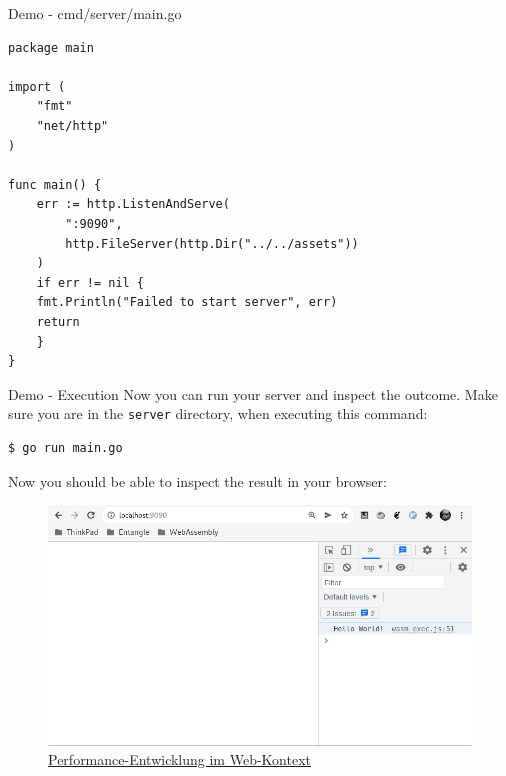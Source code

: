 \documentclass{beamer}
\begin{document}
\begin{frame}[fragile]{Demo - cmd/server/main.go}
    \begin{lstlisting}[language=html,basicstyle=\scriptsize]
package main

import (
	"fmt"
	"net/http"
)

func main() {
    err := http.ListenAndServe(
        ":9090", 
        http.FileServer(http.Dir("../../assets"))
    )
    if err != nil {
	fmt.Println("Failed to start server", err)
	return
    }
}

    \end{lstlisting}
\end{frame}

\begin{frame}[fragile]{Demo - Execution}
    Now you can run your server and inspect the outcome. Make sure you are in the \lstinline{server} directory, when executing this command:
    \begin{lstlisting}[language=bash,basicstyle=\scriptsize]
$ go run main.go
\end{lstlisting}

    Now you should be able to inspect the result in your browser:
    \begin{figure}
        \includegraphics[scale=0.3]{./images/demo.png}
        \caption{\href{https://hacks.mozilla.org/2017/02/a-cartoon-intro-to-webassembly/}{Performance-Entwicklung im Web-Kontext}}
    \end{figure}
\end{frame}
\end{document}
